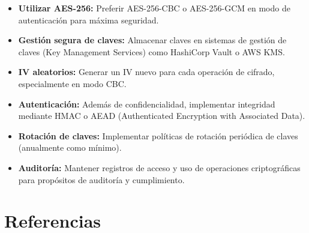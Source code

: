 \documentclass[11pt,a4paper]{article}
\begin{document}
\begin{itemize}
    \item \textbf{Utilizar AES-256:} Preferir AES-256-CBC o AES-256-GCM en modo de autenticación para máxima seguridad.

    \item \textbf{Gestión segura de claves:} Almacenar claves en sistemas de gestión de claves (Key Management Services) como HashiCorp Vault o AWS KMS.

    \item \textbf{IV aleatorios:} Generar un IV nuevo para cada operación de cifrado, especialmente en modo CBC.

    \item \textbf{Autenticación:} Además de confidencialidad, implementar integridad mediante HMAC o AEAD (Authenticated Encryption with Associated Data).

    \item \textbf{Rotación de claves:} Implementar políticas de rotación periódica de claves (anualmente como mínimo).

    \item \textbf{Auditoría:} Mantener registros de acceso y uso de operaciones criptográficas para propósitos de auditoría y cumplimiento.
\end{itemize}

\newpage
\section*{Referencias}
\end{document}
